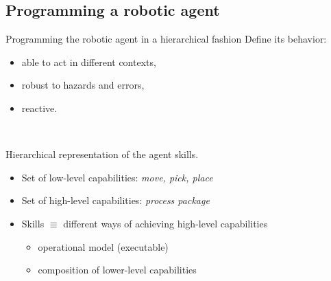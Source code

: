 \subsection{Programming a robotic agent}

\begin{frame}{Programming the robotic agent in a hierarchical fashion}
    Define its behavior:
    \begin{itemize}
        \pause
        \item able to act in different contexts,
        \pause
        \item robust to hazards and errors,
        \pause
        \item reactive.
    \end{itemize}
    
    ~~
    
    Hierarchical representation of the agent skills.
    \begin{itemize}
        \pause
        \item Set of low-level capabilities: \textit{move, pick, place}
        \pause
        \item Set of high-level capabilities: \textit{process package}
        \pause
        \item Skills $\equiv$ different ways of achieving high-level capabilities
        \begin{itemize}
            \item operational model (executable)
            \item composition of lower-level capabilities
        \end{itemize}
    \end{itemize}
\end{frame}

